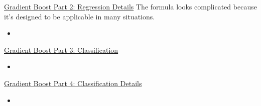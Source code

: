 \documentclass[12pt, titlepage, french]{report}
\begin{document}
\begin{YTB_SUMM_AUTO_NUMB}[label = {SQ-Boo-Reg-Det}]{\href{https://www.youtube.com/watch?v=2xudPOBz-vs&feature=youtu.be}{Gradient Boost Part 2: Regression Details}}
The formula looks complicated because it's designed to be applicable in many situations.
\begin{itemize}[leftmargin = *]
	\item	
\end{itemize}
\end{YTB_SUMM_AUTO_NUMB}

\begin{YTB_SUMM_AUTO_NUMB}[label = {SQ-Boo-Class-Idea}]{\href{https://www.youtube.com/watch?v=jxuNLH5dXCs&feature=youtu.be}{Gradient Boost Part 3: Classification}}

\begin{itemize}[leftmargin = *]
	\item	
\end{itemize}
\end{YTB_SUMM_AUTO_NUMB}

\begin{YTB_SUMM_AUTO_NUMB}[label = {SQ-Boo-Class-Det}]{\href{https://www.youtube.com/watch?v=StWY5QWMXCw&feature=youtu.be}{Gradient Boost Part 4: Classification Details}}

\begin{itemize}[leftmargin = *]
	\item	
\end{itemize}
\end{YTB_SUMM_AUTO_NUMB}
\end{document}
